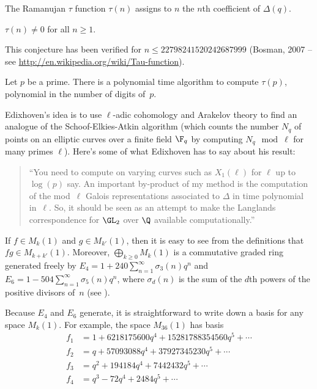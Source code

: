 \documentclass{report}
\begin{document}
The Ramanujan $\tau$ function $\tau(n)$ assigns to $n$ the $n$th
coefficient of $\Delta(q)$.
\begin{conjecture}[Lehmer]
$\tau(n)\neq 0$ for all $n\geq 1$.
\end{conjecture}
This conjecture has been verified for $n\leq 22798241520242687999$
(Bosman, 2007 -- see \url{http://en.wikipedia.org/wiki/Tau-function}).

\begin{theorem}[Edixhoven et al.]
Let $p$ be a prime. There is a polynomial time algorithm to compute
$\tau(p)$, polynomial in the number of digits of~$p$.
\end{theorem}
Edixhoven's idea is to use $\ell$-adic cohomology and Arakelov theory
to find an analogue of the Schoof-Elkies-Atkin algorithm (which counts
the number $N_q$ of points on an elliptic curves over a finite field
$\F_q$ by computing $N_q \mod \ell$ for many primes $\ell$).
Here's some of what Edixhoven has to say about his result:
\begin{quote}
  ``You need to compute on varying curves such as $X_1(\ell)$ for
  $\ell$ up to $\log(p)$ say.  An important by-product of my method is
  the computation of the mod~$\ell$ Galois representations associated
  to $\Delta$ in time polynomial in~$\ell$. So, it should be seen as
  an attempt to make the Langlands correspondence for $\GL_2$ over
  $\Q$ available computationally.''
\end{quote}

If $f\in M_k(1)$ and $g\in M_{k'}(1)$,  then it is easy
to see from the definitions that $fg\in M_{k+k'}(1)$.
Moreover,
 $\bigoplus_{k\geq 0} M_k(1)$ is a commutative
graded ring generated freely
by $E_4=1+240\sum_{n=1}^{\infty} \sigma_3(n)q^n$
and $E_6=1-504\sum_{n=1}^{\infty} \sigma_5(n) q^n$,
where $\sigma_d(n)$ is the sum of the $d$th powers
of the positive divisors of~$n$ (see
\cite[Ch.7, \S3.2]{serre:arithmetic}).

\begin{example}\label{ex:k36}
Because $E_4$ and $E_6$ generate, it is straightforward to write down
a basis for any space $M_k(1)$.  For example, the space
$M_{36}(1)$ has basis
\begin{align*}
   f_1 &= 1 + 6218175600q^4 + 15281788354560q^5 + \cdots\\
   f_2 &= q + 57093088q^4 + 37927345230q^5 + \cdots \\
   f_3 &= q^2 + 194184q^4 + 7442432q^5 +\cdots\\
   f_4 &= q^3 - 72q^4 + 2484q^5 +\cdots
\end{align*}
\end{example}
\end{document}

